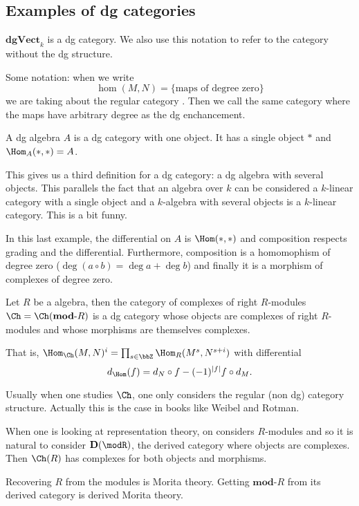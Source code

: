 \documentclass[12pt]{article}
\newcommand*{\dgVectk}{\mathbf{dgVect}_k}
\begin{document}
\subsection{Examples of dg categories}
\begin{ex}
	$\dgVectk$ is a dg category. We also use this notation to refer to the category without the dg structure.

	Some notation: when we write 
	\[\hom(M,N)=\{\text{maps of degree zero}\}\]
	we are taking about the regular category . Then we call the same category where the maps 
	have arbitrary degree as the dg enchancement.
\end{ex}
\begin{ex}
	A dg algebra $A$ is a dg category with one object. It has a single object $\ast$ and $\Hom_A(\ast,\ast)=A$.
\end{ex}
\begin{rmk}
	This gives us a third definition for a dg category: a dg algebra with several objects. This parallels the fact
	that an algebra over $k$ can be considered a $k$-linear category with a single object and a $k$-algebra with several
	objects is a $k$-linear category. This is a bit funny.
\end{rmk}
In this last example, the differential on $A$ is $\Hom(\ast,\ast)$ and composition respects grading 
and the differential. Furthermore, composition is a homomophism of degree zero ($\deg(a\circ b)=\deg a+\deg b$)
and finally it is a morphism of complexes of degree zero.
\begin{ex} 
	Let $R$ be a algebra, then the category of complexes of right $R$-modules $\Ch=\Ch(\mathbf{mod}\text{-}R)$
	is a dg category whose objects are complexes of right $R$-modules and whose morphisms are themselves complexes.

	That is, $\Hom_{\Ch}(M,N)^i=\prod_{s\in\bbZ}\Hom_R(M^s,N^{s+i})$ with differential
	\[d_{\Hom}(f)=d_N\circ f-(-1)^{|f|}f\circ d_M.\]
\end{ex}
\begin{rmk}
	Usually when one studies $\Ch$, one only considers the regular (non dg) category structure. Actually 
	this is the case in books like Weibel and Rotman.

	When one is looking at representation theory, on considers $R$-modules and so it is natural to consider
	$\mathbf{D}(\modR)$, the derived category where objects are complexes. Then $\Ch(R)$
	has complexes for both objects and morphisms.

	Recovering $R$ from the modules is Morita theory. Getting $\mathbf{mod}\text{-}R$ from its derived category
	is derived Morita theory. 
\end{rmk}
\end{document}
